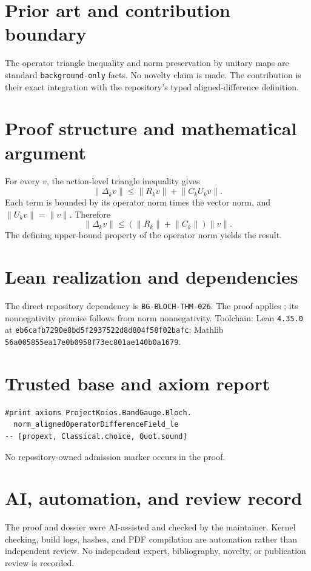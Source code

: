 \documentclass[11pt]{article}
\begin{document}
\section{Prior art and contribution boundary}
The operator triangle inequality and norm preservation by unitary maps are standard \texttt{background-only} facts.  No novelty claim is made.  The contribution is their exact integration with the repository's typed aligned-difference definition.

\section{Proof structure and mathematical argument}
For every $v$, the action-level triangle inequality gives
\[
 \lVert\Delta_kv\rVert\leq\lVert R_kv\rVert+\lVert C_kU_kv\rVert.
\]
Each term is bounded by its operator norm times the vector norm, and $\lVert U_kv\rVert=\lVert v\rVert$.  Therefore
\[
 \lVert\Delta_kv\rVert\leq(\lVert R_k\rVert+\lVert C_k\rVert)\lVert v\rVert.
\]
The defining upper-bound property of the operator norm yields the result.

\section{Lean realization and dependencies}
The direct repository dependency is \texttt{BG-BLOCH-THM-026}.  The proof applies
; its nonnegativity premise follows from norm nonnegativity.  Toolchain: Lean \texttt{4.35.0} at \texttt{eb6cafb7290e8bd5f2937522d8d804f58f02bafc}; Mathlib \texttt{56a005855ea17e0b0958f73ec801ae140b0a1679}.

\section{Trusted base and axiom report}
\begin{verbatim}
#print axioms ProjectKoios.BandGauge.Bloch.
  norm_alignedOperatorDifferenceField_le
-- [propext, Classical.choice, Quot.sound]
\end{verbatim}
No repository-owned admission marker occurs in the proof.

\section{AI, automation, and review record}
The proof and dossier were AI-assisted and checked by the maintainer.  Kernel checking, build logs, hashes, and PDF compilation are automation rather than independent review.  No independent expert, bibliography, novelty, or publication review is recorded.
\end{document}
